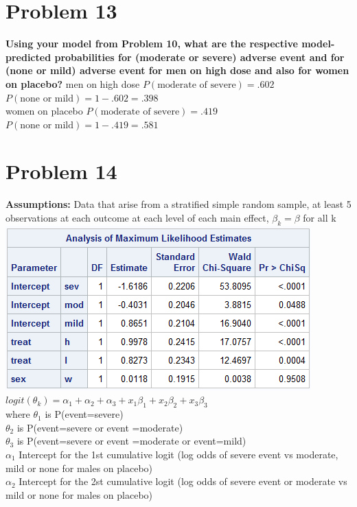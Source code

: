 \documentclass{article}
\begin{document}
\begin{flushleft}
\section*{Problem 13}
\textbf{Using your model from Problem 10, what are the respective model-predicted probabilities for
(moderate or severe) adverse event and for (none or mild) adverse event for men on high dose and
also for women on placebo?}\medbreak
men on high dose $P(\text{moderate of severe})=.602$\\
$P(\text{none or mild})=1-.602=.398$\\
women on placebo $P(\text{moderate of severe})=.419$\\
$P(\text{none or mild})=1-.419=.581$\\
\pagebreak
\section*{Problem 14}
\textbf{Assumptions:}
Data that arise from a stratified simple random sample, at least 5 observations at each outcome at
each level of each main effect, $\beta_k =\beta $ for all k\\
\includegraphics[scale=.6]{propodds.png}\\
$logit(\theta_k)=\alpha_1+\alpha_2+\alpha_3+x_1\beta_1+x_2\beta_2+x_3\beta_3$\\
where $\theta_1$ is P(event=severe)\\
$\theta_2$ is P(event=severe or event =moderate)\\
$\theta_3$ is P(event=severe or event =moderate or event=mild)\\
$\alpha_1$ Intercept for the 1st cumulative logit (log odds of severe event vs moderate, mild or none for males on placebo)\\
$\alpha_2$ Intercept for the 2st cumulative logit (log odds of severe event or moderate vs mild or none for males on placebo)\\

\end{flushleft}
\end{document}
